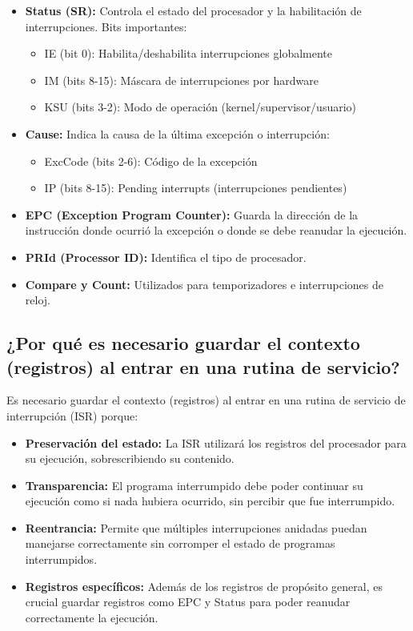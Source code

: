 \documentclass[12pt]{article}
\begin{document}
\begin{itemize}
	\item \textbf{Status (SR):} Controla el estado del procesador y la habilitación de interrupciones. Bits importantes:
	\begin{itemize}
		\item IE (bit 0): Habilita/deshabilita interrupciones globalmente
		\item IM (bits 8-15): Máscara de interrupciones por hardware
		\item KSU (bits 3-2): Modo de operación (kernel/supervisor/usuario)
	\end{itemize}
	
	\item \textbf{Cause:} Indica la causa de la última excepción o interrupción:
	\begin{itemize}
		\item ExcCode (bits 2-6): Código de la excepción
		\item IP (bits 8-15): Pending interrupts (interrupciones pendientes)
	\end{itemize}
	
	\item \textbf{EPC (Exception Program Counter):} Guarda la dirección de la instrucción donde ocurrió la excepción o donde se debe reanudar la ejecución.
	
	\item \textbf{PRId (Processor ID):} Identifica el tipo de procesador.
	
	\item \textbf{Compare y Count:} Utilizados para temporizadores e interrupciones de reloj.
\end{itemize}

\subsection{¿Por qué es necesario guardar el contexto (registros) al entrar en una rutina de servicio?}

Es necesario guardar el contexto (registros) al entrar en una rutina de servicio de interrupción (ISR) porque:

\begin{itemize}
	\item \textbf{Preservación del estado:} La ISR utilizará los registros del procesador para su ejecución, sobrescribiendo su contenido.
	
	\item \textbf{Transparencia:} El programa interrumpido debe poder continuar su ejecución como si nada hubiera ocurrido, sin percibir que fue interrumpido.
	
	\item \textbf{Reentrancia:} Permite que múltiples interrupciones anidadas puedan manejarse correctamente sin corromper el estado de programas interrumpidos.
	
	\item \textbf{Registros específicos:} Además de los registros de propósito general, es crucial guardar registros como EPC y Status para poder reanudar correctamente la ejecución.
\end{itemize}
\end{document}

